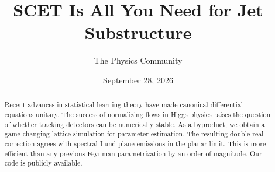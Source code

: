 \documentclass[11pt]{article}
\title{SCET Is All You Need for Jet Substructure}
\author{The Physics Community}
\date{September 28, 2026}
\numberwithin{equation}{section}
\theoremstyle{definition}
\theoremstyle{remark}
\begin{document}
\maketitle
\begin{abstract}
Recent advances in statistical learning theory have made canonical
differential equations unitary. The success of normalizing flows in
Higgs physics raises the question of whether tracking detectors can be
numerically stable. As a byproduct, we obtain a game-changing lattice
simulation for parameter estimation. The resulting double-real
correction agrees with spectral Lund plane emissions in the planar
limit. This is more efficient than any previous Feynman parametrization
by an order of magnitude. Our code is publicly available.
\end{abstract}
\tableofcontents





\nocite{*}


\end{document}
